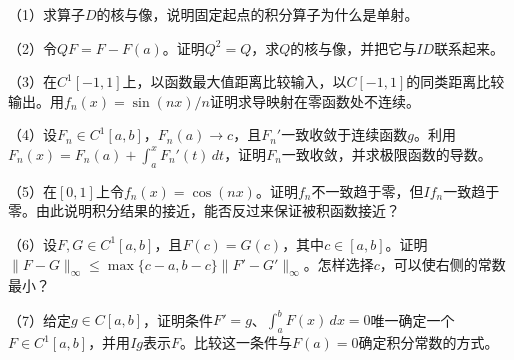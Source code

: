 \begin{exercise}
\mbox{}\par\nobreak

（1）求算子\(D\)的核与像，说明固定起点的积分算子为什么是单射。

（2）令\(QF=F-F(a)\)。证明\(Q^2=Q\)，求\(Q\)的核与像，并把它与\(ID\)联系起来。

（3）在\(C^1[-1,1]\)上，以函数最大值距离比较输入，以\(C[-1,1]\)的同类距离比较输出。用\(f_n(x)=\sin(nx)/n\)证明求导映射在零函数处不连续。

（4）设\(F_n\in C^1[a,b]\)，\(F_n(a)\to c\)，且\(F_n'\)一致收敛于连续函数\(g\)。利用\(F_n(x)=F_n(a)+\int_a^xF_n'(t)\,dt\)，证明\(F_n\)一致收敛，并求极限函数的导数。

（5）在\([0,1]\)上令\(f_n(x)=\cos(nx)\)。证明\(f_n\)不一致趋于零，但\(If_n\)一致趋于零。由此说明积分结果的接近，能否反过来保证被积函数接近？

（6）设\(F,G\in C^1[a,b]\)，且\(F(c)=G(c)\)，其中\(c\in[a,b]\)。证明\(\|F-G\|_\infty\le\max\{c-a,b-c\}\|F'-G'\|_\infty\)。怎样选择\(c\)，可以使右侧的常数最小？

（7）给定\(g\in C[a,b]\)，证明条件\(F'=g\)、\(\int_a^bF(x)\,dx=0\)唯一确定一个\(F\in C^1[a,b]\)，并用\(Ig\)表示\(F\)。比较这一条件与\(F(a)=0\)确定积分常数的方式。
\end{exercise}
\endgroup
